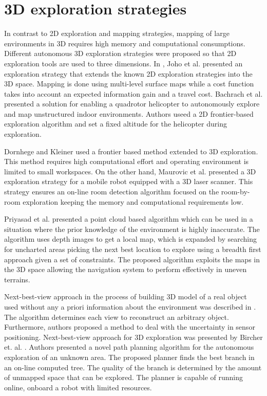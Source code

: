 \section{3D exploration strategies}

In contrast to 2D exploration and mapping strategies, mapping of large environments in 3D requires high memory and
computational consumptions. 
Different autonomous 3D exploration strategies were proposed so that 2D
exploration tools are used to three dimensions. In \cite{Joho2007}, Joho et al. presented an exploration strategy that extends the known 2D exploration strategies into the 3D space. Mapping is done using multi-level surface maps while a cost function takes
into account an expected information gain and a travel cost. 
Bachrach et
al. \cite{Bachrach2009} presented a solution for enabling a quadrotor helicopter to
autonomously explore and map unstructured indoor environments. Authors useed a 2D frontier-based exploration algorithm and set a fixed altitude for the helicopter
during exploration.  

Dornhege and Kleiner \cite{Dornhege2013} used a frontier based method extended to 3D exploration. This method requires high computational effort and operating environment is limited to small workspaces. On the other hand, Maurovic et al. \cite{Maurovic2014} presented a 3D exploration strategy for a mobile
robot equipped with a 3D laser scanner. This strategy ensures an on-line room detection algorithm focused on the room-by-room exploration keeping the memory and computational
requirements low.

Priyasad et al. \cite{Priyasad2018} presented a point cloud based algorithm which can be used in a situation where
the prior knowledge of the environment is highly inaccurate. The algorithm uses depth images to get a local map, which is expanded by searching for uncharted areas picking the next best
location to explore using a breadth first approach given a set of
constraints. The proposed algorithm exploits the maps in the 3D
space allowing the navigation system to perform effectively in uneven terrains. 

Next-best-view approach in the process of building 3D model of a real object used without any a priori information about the environment was described in \cite{VasquezGomez2014}. The algorithm determines each view to reconstruct an arbitrary object. Furthermore, authors proposed a method to deal with the uncertainty in sensor positioning.
Next-best-view approach for 3D exploration was presented by Bircher et. al. \cite{Bircher2016}. Authors presented a novel path planning algorithm for the autonomous exploration of an unknown area. The proposed planner finds the best branch in an on-line computed tree. The quality of the branch is determined by the amount of unmapped space that can be explored. The planner is capable of running online, onboard a robot with limited resources.

